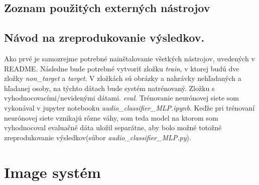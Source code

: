 \documentclass{article}
\begin{document}
    \subsection{Zoznam použitých externých nástrojov}
    
    \subsection{Návod na zreprodukovanie výsledkov.}
    \Large{Ako prvé je samozrejme potrebné nainštalovanie všetkých nástrojov, uvedených v README. Následne bude potrebné vytvoriť zložku \textit{train}, v ktorej budú dve zložky \textit{non\_target} a \textit{target}. V zložkách sú obrázky a nahrávky nehľadaných a hľadanej osoby, na týchto dátach bude systém natrénovaný. Zložku s vyhodnocovacími/nevidenými dátami. \textit{eval}. Trénovanie neurónovej siete som vykonával v jupyter notebooku \textit{audio\_classifier\_MLP.ipynb}. Keďže pri trénovaní neurónovej siete vznikajú rôzne váhy, som teda model na ktorom som vyhodnocoval evaluačné dáta uložil separátne, aby bolo možné totožné zreprodukovanie výsledkov(súbor \textit{audio\_classifier\_MLP.py}).}

    \section{Image systém}
\end{document}
